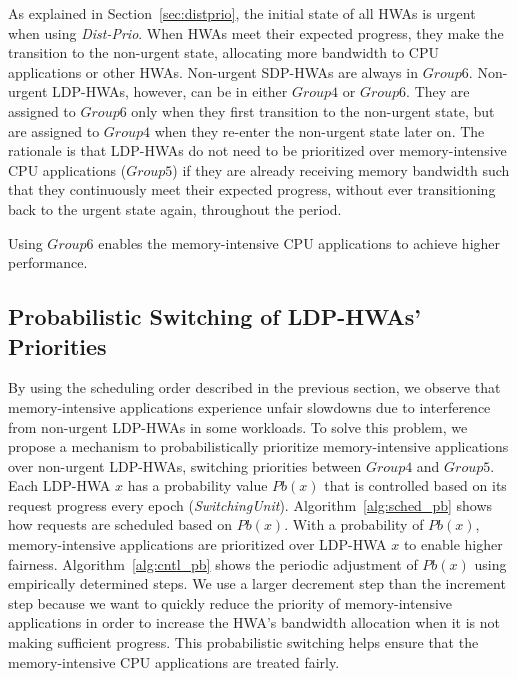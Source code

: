 \documentclass[10pt,letterpaper]{article}
\newcommand{\TMP}[1]{#1}
\newcommand{\ldphwas}[0]{LDP-HWAs\xspace}
\newif\ifOPTION
\begin{document}
\TMP{As explained in Section~\ref{sec:distprio}, the initial state of all HWAs is
urgent when using \emph{Dist-Prio}. When HWAs meet their expected progress, they make the
transition to the non-urgent state, allocating more bandwidth to CPU
applications or other HWAs. }
Non-urgent SDP-HWAs are always in $Group6$. Non-urgent LDP-HWAs, however, can be in
either $Group4$ or $Group6$. They are assigned to $Group6$ only
when they first transition to the non-urgent state, but are assigned to $Group4$
when they re-enter the non-urgent state later on. The rationale is that LDP-HWAs
do not need to be prioritized over memory-intensive CPU applications ($Group5$)
if they are already receiving memory bandwidth such that they continuously meet
their expected progress, without ever transitioning back to the urgent state
again, throughout the period.
\ifOPTION
{This kind of a priority scheme enables LDP-HWAs to make progress while not over-consuming memory
bandwidth and enables memory-intensive CPU applications to achieve
higher performance.}
\else
Using $Group6$ enables the memory-intensive CPU applications to achieve
higher performance.
\fi

















\subsection{Probabilistic Switching of LDP-HWAs' Priorities}
\label{sec:prob-switching}

By using the scheduling order described in the previous section, we observe that
memory-intensive applications experience unfair slowdowns due to interference
from non-urgent \ldphwas in some workloads. To solve this problem, we propose a
mechanism to probabilistically prioritize memory-intensive applications over
non-urgent LDP-HWAs, switching priorities between $Group4$ and $Group5$. Each
LDP-HWA $x$ has a probability value $Pb(x)$ that is controlled based on its
request progress every epoch ({\it SwitchingUnit}).
Algorithm~\ref{alg:sched_pb} shows how requests are scheduled based on $Pb(x)$.
With a probability of $Pb(x)$, memory-intensive applications are prioritized
over LDP-HWA $x$ to enable higher fairness. Algorithm~\ref{alg:cntl_pb} shows
the periodic adjustment of $Pb(x)$ using empirically determined steps. We use a
larger decrement step than the increment step because we want to quickly reduce
the priority of memory-intensive applications in order to increase the HWA's
bandwidth allocation when it is not making sufficient progress. This
probabilistic switching helps ensure that the memory-intensive CPU applications
are treated fairly.
\end{document}
